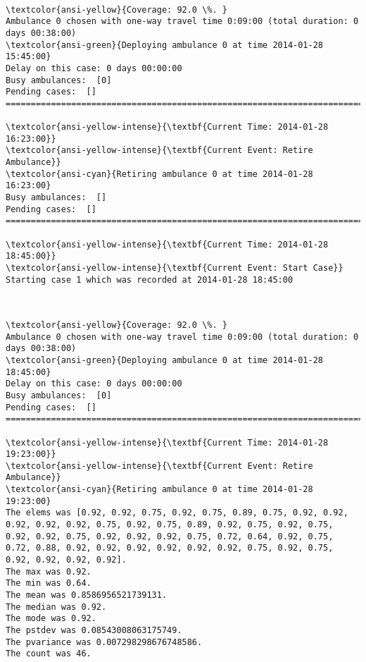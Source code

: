 \documentclass[11pt]{article}
\begin{document}
    \begin{center}
    \end{center}
    { \hspace*{\fill} \\}
    
    \begin{Verbatim}[commandchars=\\\{\}]
\textcolor{ansi-yellow}{Coverage: 92.0 \%. }
Ambulance 0 chosen with one-way travel time 0:09:00 (total duration: 0 days 00:38:00)
\textcolor{ansi-green}{Deploying ambulance 0 at time 2014-01-28 15:45:00}
Delay on this case: 0 days 00:00:00
Busy ambulances:  [0]
Pending cases:  []
========================================================================

\textcolor{ansi-yellow-intense}{\textbf{Current Time: 2014-01-28 16:23:00}}
\textcolor{ansi-yellow-intense}{\textbf{Current Event: Retire Ambulance}}
\textcolor{ansi-cyan}{Retiring ambulance 0 at time 2014-01-28 16:23:00}
Busy ambulances:  []
Pending cases:  []
========================================================================

\textcolor{ansi-yellow-intense}{\textbf{Current Time: 2014-01-28 18:45:00}}
\textcolor{ansi-yellow-intense}{\textbf{Current Event: Start Case}}
Starting case 1 which was recorded at 2014-01-28 18:45:00

    \end{Verbatim}

    \begin{center}
    \end{center}
    { \hspace*{\fill} \\}
    
    \begin{Verbatim}[commandchars=\\\{\}]
\textcolor{ansi-yellow}{Coverage: 92.0 \%. }
Ambulance 0 chosen with one-way travel time 0:09:00 (total duration: 0 days 00:38:00)
\textcolor{ansi-green}{Deploying ambulance 0 at time 2014-01-28 18:45:00}
Delay on this case: 0 days 00:00:00
Busy ambulances:  [0]
Pending cases:  []
========================================================================

\textcolor{ansi-yellow-intense}{\textbf{Current Time: 2014-01-28 19:23:00}}
\textcolor{ansi-yellow-intense}{\textbf{Current Event: Retire Ambulance}}
\textcolor{ansi-cyan}{Retiring ambulance 0 at time 2014-01-28 19:23:00}
The elems was [0.92, 0.92, 0.75, 0.92, 0.75, 0.89, 0.75, 0.92, 0.92, 0.92, 0.92, 0.92, 0.75, 0.92, 0.75, 0.89, 0.92, 0.75, 0.92, 0.75, 0.92, 0.92, 0.75, 0.92, 0.92, 0.92, 0.75, 0.72, 0.64, 0.92, 0.75, 0.72, 0.88, 0.92, 0.92, 0.92, 0.92, 0.92, 0.92, 0.75, 0.92, 0.75, 0.92, 0.92, 0.92, 0.92]. 
The max was 0.92. 
The min was 0.64. 
The mean was 0.8586956521739131. 
The median was 0.92. 
The mode was 0.92. 
The pstdev was 0.08543008063175749. 
The pvariance was 0.007298298676748586. 
The count was 46. 

    \end{Verbatim}
\end{document}
